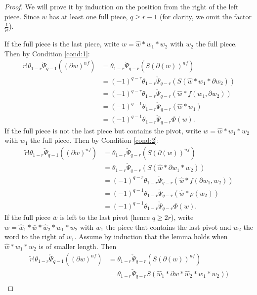 \begin{proof}
	We will prove it by induction on the position from the right of the left piece. Since $w$ has at least one full piece, $q\geq r-1$ (for clarity, we omit the factor $\frac{1}{\tilde{r}!}$).

	If the full piece is the last piece, write $w=\hat{w}*w_1*w_2$ with $w_2$ the full piece. Then by Condition \eqref{cond:1}:
	\begin{align*}
	    \tilde{r}!\theta_{1-r}\check{\Psi}_{q-1}((\partial w)^{nf}) &=
		\theta_{1-r}\check{\Psi}_{q-r}(S(\partial(w))^{nf}) \\
		&= (-1)^{q-r} \theta_{1-r}\check{\Psi}_{q-r}(S(\hat{w}*w_1*\partial w_2)) \\
		&= (-1)^{q-r} \theta_{1-r}\check{\Psi}_{q-r}(\hat{w}*f(w_1,\partial w_2)) \\
		&= (-1)^{q-1} \theta_{1-r}\check{\Psi}_{q-r}(\hat{w}*w_1) \\
		&= (-1)^{q-1} \theta_{1-r}\check{\Psi}_{q-r}\Phi(w).
	\end{align*}
	If the full piece is not the last piece but contains the pivot, write $w=\hat{w}*w_1*w_2$ with $w_1$ the full piece. Then by Condition \eqref{cond:2}:
	\begin{align*}
	    \tilde{r}!\theta_{1-r}\check{\Psi}_{q-1}((\partial w)^{nf}) &=
        \theta_{1-r}\check{\Psi}_{q-r}(S(\partial(w))^{nf}) \\&= \theta_{1-r}\check{\Psi}_{q-r}(S(\hat{w}*\partial w_1* w_2)) \\
		&= (-1)^{q-r} \theta_{1-r}\check{\Psi}_{q-r}(\hat{w}*f(\partial w_1, w_2)) \\
		&= (-1)^{q-1} \theta_{1-r}\check{\Psi}_{q-r}(\hat{w}*\rho(w_2)) \\
		&= (-1)^{q-1} \theta_{1-r}\check{\Psi}_{q-r}\Phi(w).
	\end{align*}
	If the full piece $\bar{w}$ is left to the last pivot (hence $q\geq 2r$), write $w=\hat{w}_1*\bar{w}*\hat{w}_2*w_1*w_2$ with $w_1$ the piece that contains the last pivot and $w_2$ the word to the right of $w_1$. Assume by induction that the lemma holds when $\hat{w}*w_1*w_2$ is of smaller length. Then
	\begin{align*}
		\tilde{r}!\theta_{1-r}\check{\Psi}_{q-1}((\partial w)^{nf}) &=
\theta_{1-r}\check{\Psi}_{q-r}(S(\partial(w))^{nf}) \\ 
		&= \theta_{1-r}\check{\Psi}_{q-r}S(\hat{w}_1*\partial\bar{w}*\hat{w}_2*w_1*w_2)) \\

\end{align*}
\end{proof}
